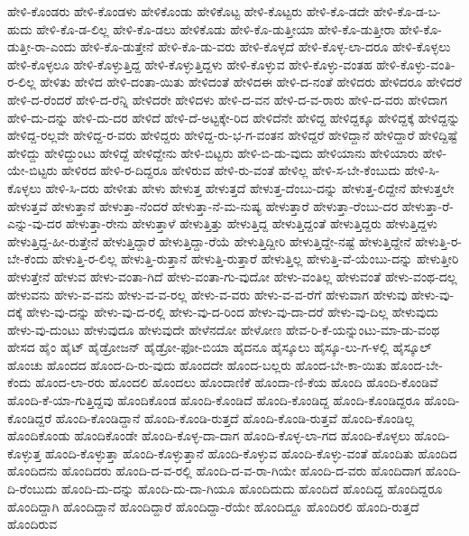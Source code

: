 {ಹೇಳಿ-ಕೊಂಡರು
ಹೇಳಿ-ಕೊಂಡಳು
ಹೇಳಿಕೊಂಡು
ಹೇಳಿಕೊಟ್ಟ
ಹೇಳಿ-ಕೊಟ್ಟರು
ಹೇಳಿ-ಕೊ-ಡದೇ
ಹೇಳಿ-ಕೊ-ಡ-ಬ-ಹುದು
ಹೇಳಿ-ಕೊ-ಡ-ಲಿಲ್ಲ
ಹೇಳಿ-ಕೊ-ಡಲು
ಹೇಳಿಕೊಡು
ಹೇಳಿ-ಕೊ-ಡುತ್ತೀಯಾ
ಹೇಳಿ-ಕೊ-ಡುತ್ತೀರಾ
ಹೇಳಿ-ಕೊ-ಡುತ್ತೀ-ರಾ-ಎಂದು
ಹೇಳಿ-ಕೊ-ಡುತ್ತೇನೆ
ಹೇಳಿ-ಕೊ-ಡು-ವರು
ಹೇಳಿ-ಕೊಳ್ಳದೆ
ಹೇಳಿ-ಕೊಳ್ಳ-ಲಾ-ದರೂ
ಹೇಳಿ-ಕೊಳ್ಳಲು
ಹೇಳಿ-ಕೊಳ್ಳಲೂ
ಹೇಳಿ-ಕೊಳ್ಳುತ್ತಿದ್ದ
ಹೇಳಿ-ಕೊಳ್ಳುತ್ತಿದ್ದಳು
ಹೇಳಿ-ಕೊಳ್ಳುವ
ಹೇಳಿ-ಕೊಳ್ಳು-ವಂತಹ
ಹೇಳಿ-ಕೊಳ್ಳು-ವಂತಿ-ರ-ಲಿಲ್ಲ
ಹೇಳಿತು
ಹೇಳಿದ
ಹೇಳಿ-ದಂತಾ-ಯಿತು
ಹೇಳಿದಂತೆ
ಹೇಳಿದಈ
ಹೇಳಿ-ದ-ನಂತೆ
ಹೇಳಿದರು
ಹೇಳಿದರೂ
ಹೇಳಿದರೆ
ಹೇಳಿ-ದ-ರೆಂದರೆ
ಹೇಳಿ-ದ-ರೆನ್ನಿ
ಹೇಳಿದರೇ
ಹೇಳಿದಳು
ಹೇಳಿ-ದ-ವನ
ಹೇಳಿ-ದ-ವ-ರಾರು
ಹೇಳಿ-ದ-ವರು
ಹೇಳಿದಾಗ
ಹೇಳಿ-ದು-ದನ್ನು
ಹೇಳಿ-ದು-ದರ
ಹೇಳಿದೆ
ಹೇಳಿ-ದೆ-ಅಟ್ಟಕ್ಕೇ-ರಿದ
ಹೇಳಿದೆನೇ
ಹೇಳಿದ್ದ
ಹೇಳಿದ್ದಕ್ಕೂ
ಹೇಳಿದ್ದಕ್ಕೆ
ಹೇಳಿದ್ದನ್ನು
ಹೇಳಿದ್ದ-ರಲ್ಲವೇ
ಹೇಳಿದ್ದ-ರ-ವರು
ಹೇಳಿದ್ದರು
ಹೇಳಿದ್ದ-ರು-ಭ-ಗ-ವಂತನ
ಹೇಳಿದ್ದರೆ
ಹೇಳಿದ್ದಾನೆ
ಹೇಳಿದ್ದಾರೆ
ಹೇಳಿದ್ದಿಷ್ಟೆ
ಹೇಳಿದ್ದು
ಹೇಳಿದ್ದುಂಟು
ಹೇಳಿದ್ದೆ
ಹೇಳಿದ್ದೇನು
ಹೇಳಿ-ಬಿಟ್ಟರು
ಹೇಳಿ-ಬಿ-ಡು-ವುದು
ಹೇಳಿಯಾನು
ಹೇಳಿಯಾರು
ಹೇಳಿ-ಯೇ-ಬಿಟ್ಟರು
ಹೇಳಿರದ
ಹೇಳಿ-ರ-ದಿದ್ದರೂ
ಹೇಳಿರುವ
ಹೇಳಿ-ರು-ವಂತೆ
ಹೇಳಿಲ್ಲ
ಹೇಳಿ-ಸ-ಬೇ-ಕೆಂಬುದು
ಹೇಳಿ-ಸಿ-ಕೊಳ್ಳಲು
ಹೇಳಿ-ಸಿ-ದರು
ಹೇಳೀತು
ಹೇಳು
ಹೇಳುತ್ತ
ಹೇಳುತ್ತದೆ
ಹೇಳುತ್ತ-ದೆಂಬು-ದನ್ನು
ಹೇಳುತ್ತ-ಲಿದ್ದೇನೆ
ಹೇಳುತ್ತಲೇ
ಹೇಳುತ್ತವೆ
ಹೇಳುತ್ತಾನೆ
ಹೇಳುತ್ತಾ-ನೆಂದರೆ
ಹೇಳುತ್ತಾ-ನೆ-ಮ-ನುಷ್ಯ
ಹೇಳುತ್ತಾರೆ
ಹೇಳುತ್ತಾ-ರೆಂಬು-ದರ
ಹೇಳುತ್ತಾ-ರೆ-ಎನ್ನು-ವು-ದರ
ಹೇಳುತ್ತಾ-ರೇನು
ಹೇಳುತ್ತಾಳೆ
ಹೇಳುತ್ತಿತ್ತು
ಹೇಳುತ್ತಿದ್ದ
ಹೇಳುತ್ತಿದ್ದಂತೆ
ಹೇಳುತ್ತಿದ್ದರು
ಹೇಳುತ್ತಿದ್ದಳು
ಹೇಳುತ್ತಿದ್ದ-ಹೀ-ರುತ್ತೇನೆ
ಹೇಳುತ್ತಿದ್ದಾರೆ
ಹೇಳುತ್ತಿದ್ದಾ-ರೆಯೆ
ಹೇಳುತ್ತಿದ್ದೀರಿ
ಹೇಳುತ್ತಿದ್ದೇ-ನಷ್ಟೆ
ಹೇಳುತ್ತಿದ್ದೇನೆ
ಹೇಳುತ್ತಿ-ರ-ಬೇ-ಕೆಂದು
ಹೇಳುತ್ತಿ-ರ-ಲಿಲ್ಲ
ಹೇಳುತ್ತಿ-ರುತ್ತಾನೆ
ಹೇಳುತ್ತಿ-ರುತ್ತಾರೆ
ಹೇಳುತ್ತಿಲ್ಲ
ಹೇಳುತ್ತಿ-ವೆ-ಯೆಂಬು-ದನ್ನು
ಹೇಳುತ್ತೀರಿ
ಹೇಳುತ್ತೇನೆ
ಹೇಳುವ
ಹೇಳು-ವಂತಾ-ಗಿದೆ
ಹೇಳು-ವಂತಾ-ಗು-ವುದೋ
ಹೇಳು-ವಂತಿಲ್ಲ
ಹೇಳುವಂತೆ
ಹೇಳು-ವಂಥ-ದಲ್ಲ
ಹೇಳುವನು
ಹೇಳು-ವ-ವನು
ಹೇಳು-ವ-ವ-ರಲ್ಲ
ಹೇಳು-ವ-ವರು
ಹೇಳು-ವ-ವ-ರೆಗೆ
ಹೇಳುವಾಗ
ಹೇಳುವು
ಹೇಳು-ವು-ದಕ್ಕೆ
ಹೇಳು-ವು-ದನ್ನು
ಹೇಳು-ವು-ದ-ರಲ್ಲಿ
ಹೇಳು-ವು-ದ-ರಿಂದ
ಹೇಳು-ವು-ದಾ-ದರೆ
ಹೇಳು-ವು-ದಿಲ್ಲ
ಹೇಳುವುದು
ಹೇಳು-ವು-ದುಂಟು
ಹೇಳುವುದೂ
ಹೇಳುವುದೇ
ಹೇಳೆನದೋ
ಹೇಳೋಣ
ಹೇವ-ರಿ-ಕೆ-ಯನ್ನುಂಟು-ಮಾ-ಡು-ವಂಥ
ಹೇಸದ
ಹೈಂ
ಹೈಟ್
ಹೈಡ್ರೋಜನ್
ಹೈಡ್ರೋ-ಫೋ-ಬಿಯಾ
ಹೈದನೂ
ಹೈಸ್ಕೂಲು
ಹೈಸ್ಕೂ-ಲು-ಗ-ಳಲ್ಲಿ
ಹೈಸ್ಕೂಲ್
ಹೊಂಚು
ಹೊಂದದ
ಹೊಂದ-ದಿ-ರು-ವುದು
ಹೊಂದದೇ
ಹೊಂದ-ಬಲ್ಲರು
ಹೊಂದ-ಬೇ-ಕಾ-ಯಿತು
ಹೊಂದ-ಬೇ-ಕೆಂದು
ಹೊಂದ-ಲಾ-ರರು
ಹೊಂದಲಿ
ಹೊಂದಲು
ಹೊಂದಾಣಿಕೆ
ಹೊಂದಾ-ಣಿ-ಕೆಯ
ಹೊಂದಿ
ಹೊಂದಿ-ಕೊಂಡಿವೆ
ಹೊಂದಿ-ಕೆ-ಯಾ-ಗುತ್ತಿದ್ದವು
ಹೊಂದಿಕೊಂಡ
ಹೊಂದಿ-ಕೊಂಡಿದೆ
ಹೊಂದಿ-ಕೊಂಡಿದ್ದ
ಹೊಂದಿ-ಕೊಂಡಿದ್ದರೂ
ಹೊಂದಿ-ಕೊಂಡಿದ್ದರೆ
ಹೊಂದಿ-ಕೊಂಡಿದ್ದಾನೆ
ಹೊಂದಿ-ಕೊಂಡಿ-ರುತ್ತದೆ
ಹೊಂದಿ-ಕೊಂಡಿ-ರುತ್ತವೆ
ಹೊಂದಿ-ಕೊಂಡಿಲ್ಲ
ಹೊಂದಿಕೊಂಡು
ಹೊಂದಿಕೊಂಡೇ
ಹೊಂದಿ-ಕೊಳ್ಳ-ದಾ-ದಾಗ
ಹೊಂದಿ-ಕೊಳ್ಳ-ಲಾ-ಗದ
ಹೊಂದಿ-ಕೊಳ್ಳಲು
ಹೊಂದಿ-ಕೊಳ್ಳುತ್ತ
ಹೊಂದಿ-ಕೊಳ್ಳುತ್ತಾ
ಹೊಂದಿ-ಕೊಳ್ಳುತ್ತಾನೆ
ಹೊಂದಿ-ಕೊಳ್ಳುವ
ಹೊಂದಿ-ಕೊಳ್ಳು-ವಂತೆ
ಹೊಂದಿತು
ಹೊಂದಿದ
ಹೊಂದಿದನು
ಹೊಂದಿದರು
ಹೊಂದಿ-ದ-ವ-ರಲ್ಲಿ
ಹೊಂದಿ-ದ-ವ-ರಾ-ಗಿಯೇ
ಹೊಂದಿ-ದ-ವರು
ಹೊಂದಿದಾಗ
ಹೊಂದಿ-ದಿ-ರೆಂಬುದು
ಹೊಂದಿ-ದು-ದನ್ನು
ಹೊಂದಿ-ದು-ದಾ-ಗಿಯೂ
ಹೊಂದಿದುದು
ಹೊಂದಿದೆ
ಹೊಂದಿದ್ದ
ಹೊಂದಿದ್ದರೂ
ಹೊಂದಿದ್ದಾಗಿ
ಹೊಂದಿದ್ದಾನೆ
ಹೊಂದಿದ್ದಾರೆ
ಹೊಂದಿದ್ದಾ-ರೆಯೇ
ಹೊಂದಿದ್ದೂ
ಹೊಂದಿರಲಿ
ಹೊಂದಿ-ರುತ್ತದೆ
ಹೊಂದಿರುವ
}
